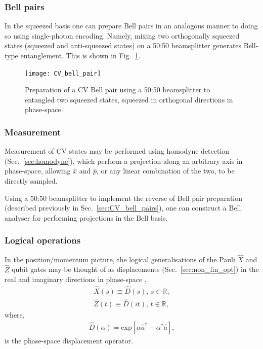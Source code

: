 %
%

\subsubsection{Bell pairs}\label{sec:CV_bell_pairs}

In the squeezed basis one can prepare Bell pairs in an analogous manner to doing so using single-photon encoding. Namely, mixing two orthogonally squeezed states (squeezed and anti-squeezed states) on a 50:50 beamsplitter generates Bell-type entanglement. This is shown in Fig.~\ref{fig:CV_bell_pair}.

\begin{figure}[htpb]
\texttt{[image: CV\_bell\_pair]}
\caption{Preparation of a CV Bell pair using a 50:50 beamsplitter to entangled two  squeezed states, squeezed in orthogonal directions in phase-space.}\label{fig:CV_bell_pair}	
\end{figure}


%
%

\subsubsection{Measurement}

Measurement of CV states may be performed using homodyne detection (Sec.~\ref{sec:homodyne}), which perform a projection along an arbitrary axis in phase-space, allowing $\hat{x}$ and $\hat{p}$, or any linear combination of the two, to be directly sampled.

Using a 50:50 beamsplitter to implement the reverse of Bell pair preparation (described previously in Sec.~\ref{sec:CV_bell_pairs}), one can construct a Bell analyser for performing projections in the Bell basis.



%
%

\subsubsection{Logical operations}

In the position/momentum picture, the logical generalisations of the Pauli $\hat{X}$ and $\hat{Z}$ qubit gates may be thought of as displacements (Sec.~\ref{sec:non_lin_opt}) in the real and imaginary directions in phase-space \cite{bib:KokLovettBook},
\begin{align}
\hat{X}(s) \equiv \hat{D}(s)	, \, s\in\mathbb{R},\nonumber\\
\hat{Z}(t) \equiv \hat{D}(it), \, t\in\mathbb{R},
\end{align}
where,
\begin{align}\label{eq:disp_op}
\hat{D}(\alpha) = \mathrm{exp}\left[\alpha\hat{a}^\dag - \alpha^*\hat{a}\right],
\end{align}
is the phase-space displacement operator.


